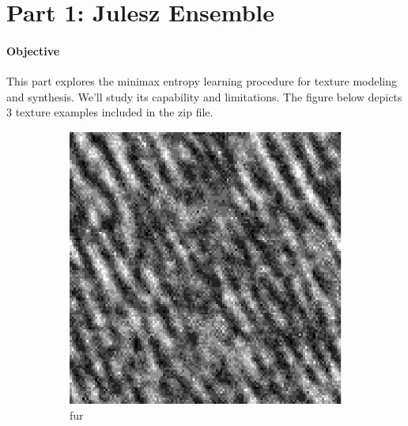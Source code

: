 \documentclass[11pt]{article}
\begin{document}
\clearpage

\section{Part 1: Julesz Ensemble}

\paragraph{Objective}

This part explores the minimax entropy learning procedure for texture modeling and synthesis. We'll study its capability and limitations. The figure below depicts 3 texture examples included in the zip file.

\begin{figure}[ht!]
    \centering
    \hfill%
    \begin{subfigure}[]{0.333\linewidth}
        \centering
        \includegraphics[width=\linewidth]{figs_for_latex_only/image1.jpg}
        \caption{fur}
    \end{subfigure}%
    \hfill%
    \begin{subfigure}[]{0.333\linewidth}
        \centering

\end{subfigure}
\end{figure}
\end{document}
